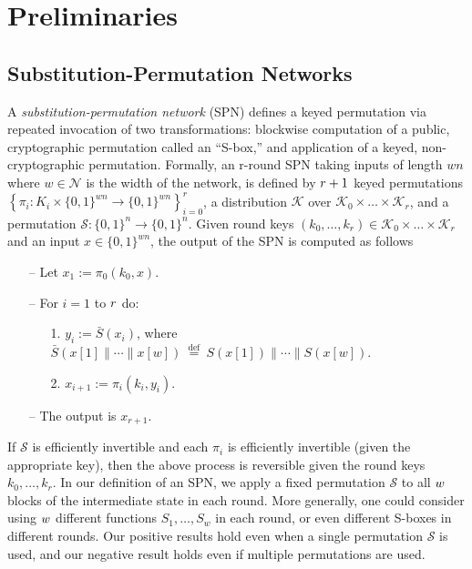 

\section{Preliminaries}
\label{section:preliminary}

\subsection{Substitution-Permutation Networks}
A \emph{substitution-permutation network }(SPN) defines a keyed permutation via repeated invocation of two transformations: blockwise computation of a public, cryptographic permutation called an ``S-box,'' and application of a keyed, non-cryptographic permutation. Formally, an r-round SPN taking inputs of length $w n$ where $w \in \mathcal{N}$ is the width of the network, is defined by $\mathnormal{r}+1$ keyed permutations $\left\{\pi_{i}: K_{i} \times\{0,1\}^{w n} \rightarrow\{0,1\}^{w n}\right\}_{i=0}^{r}$, a distribution $\mathcal{K}$ over $\mathcal{K}_{0} \times \dots \times \mathcal{K}_{r}$, and a permutation $\mathcal{S}:\{0,1\}^{n} \rightarrow \{0,1\}^{n}$. Given round keys $(k_{0},\dots, k_{r}) \in \mathcal{K}_{0} \times \dots \times \mathcal{K}_{r}$ and an input $x \in \{0,1\}^{w n}$, the output of the SPN is computed as follows

\begin{itemize}
  \item[--]
  Let $x_{1} := \pi_{0}(k_{0},x)$.
  \item[--]
  For $i = 1$ to $\mathnormal{r}$ do:
  \begin{itemize}
    \item[1.]
    $y_{i} := \bar{S}(x_{i})$, where $\bar{S}(x[1]\|\cdots\| x[w]) \stackrel{\text { def }}{=} S(x[1])\|\cdots\| S(x[w])$.
    \item[2.]
    $x_{i + 1} := \pi_{i}(k_{i},y_{i})$.
  \end{itemize}
  \item[--]
  The output is $x_{r+1}$.
\end{itemize}

If $\mathcal{S}$ is efficiently invertible and each $\pi_{i}$ is efficiently invertible (given the appropriate key), then the above process is reversible given the round keys $k_{0}, \dots ,k_{r}$. In our definition of an SPN, we apply a fixed permutation $\mathcal{S}$ to all $\mathnormal{w}$ blocks of the intermediate state in each round. More generally, one could consider using $\mathnormal{w}$ different functions $S_{1}, \dots ,S_{w}$ in each round, or even different S-boxes in different rounds. Our positive results hold even when a single permutation $\mathcal{S}$ is used, and our negative result holds even if multiple permutations are used.\\


